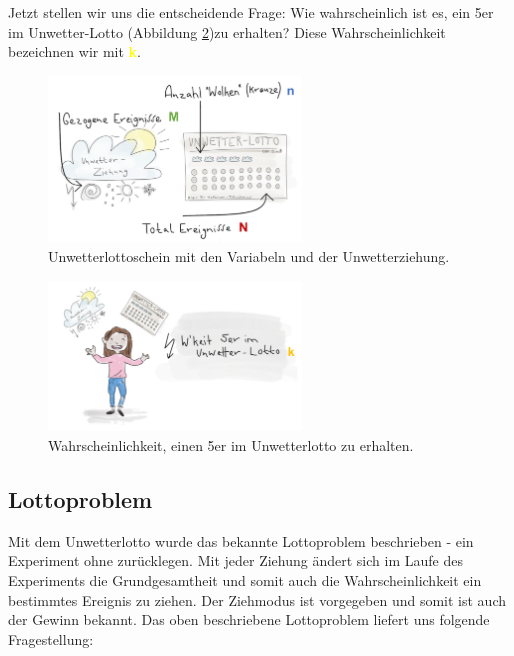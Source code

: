 \begin{refsection}
Jetzt stellen wir uns die entscheidende Frage: Wie wahrscheinlich ist es, ein 5er im Unwetter-Lotto (Abbildung \ref{WahrscheinlichkeitUnwetterlotto})zu erhalten? Diese Wahrscheinlichkeit bezeichnen wir mit \textcolor{yellow}{\textbf{k}}.

\begin{figure}[htbp]
\centering
\includegraphics[width=0.6\textwidth]{extrem/Lottoscheinausgefuellt.pdf}
\caption{Unwetterlottoschein mit den Variabeln und der Unwetterziehung.}
\label{Lottoscheinausgefuellt}
\end{figure}

\begin{figure}[htbp]
\centering
\includegraphics[width=0.6\textwidth]{extrem/wkeitlotto.pdf}
\caption{Wahrscheinlichkeit, einen 5er im Unwetterlotto zu erhalten.}
\label{WahrscheinlichkeitUnwetterlotto}
\end{figure}

\subsection{Lottoproblem} \label{Lottoproblem}
Mit dem Unwetterlotto wurde das bekannte Lottoproblem beschrieben - ein Experiment ohne zurücklegen. Mit jeder Ziehung ändert sich im Laufe des Experiments die Grundgesamtheit und somit auch die Wahrscheinlichkeit ein bestimmtes Ereignis zu ziehen. Der Ziehmodus ist vorgegeben und somit ist auch der Gewinn bekannt.
Das oben beschriebene Lottoproblem liefert uns folgende Fragestellung:



\end{refsection}
